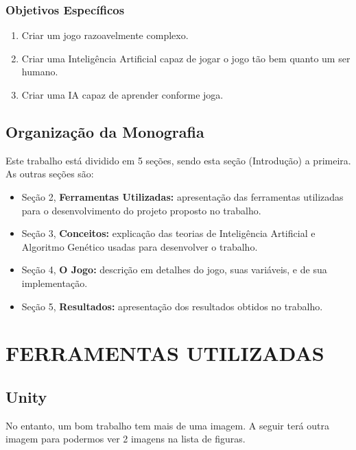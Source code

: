 \documentclass[12pt,a4paper]{article}
\begin{document}
		\subsubsection{Objetivos Específicos}
			\begin{enumerate}[noitemsep]
				\item Criar um jogo razoavelmente complexo.
				\item Criar uma Inteligência Artificial capaz de jogar o jogo tão bem quanto um ser humano.
				\item Criar uma IA capaz de aprender conforme joga.
			\end{enumerate}			
	
	\subsection{Organização da Monografia}
		Este trabalho está dividido em 5 seções, sendo esta seção (Introdução) a primeira. As outras seções são:
		\begin{itemize}[noitemsep]
     		\item Seção 2, \textbf{Ferramentas Utilizadas:} apresentação das ferramentas utilizadas para o desenvolvimento do projeto proposto no trabalho.
     		\item Seção 3, \textbf{Conceitos:} explicação das teorias de Inteligência Artificial e Algoritmo Genético usadas para desenvolver o trabalho.
     		\item Seção 4, \textbf{O Jogo:} descrição em detalhes do jogo, suas variáveis, e de sua implementação.
     		\item Seção 5, \textbf{Resultados:} apresentação dos resultados obtidos no trabalho.
  	 	\end{itemize}

\clearpage %
\section{FERRAMENTAS UTILIZADAS}

	\subsection{Unity}
	No entanto, um bom trabalho tem mais de uma imagem.
	A seguir terá outra imagem para podermos ver 2 imagens na lista de figuras.
\end{document}
